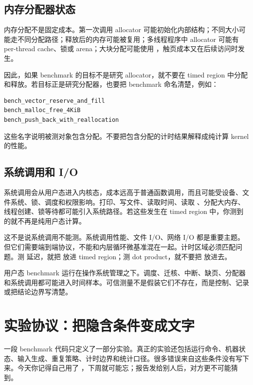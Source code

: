 \subsection{内存分配器状态}

内存分配不是固定成本。第一次调用 allocator 可能初始化内部结构；不同大小可能走不同分配路径；释放后的内存可能被复用；多线程程序中 allocator 可能有 per-thread cache、锁或 arena；大块分配可能使用 ，触页成本又在后续访问时发生。

因此，如果 benchmark 的目标不是研究 allocator，就不要在 timed region 中分配和释放。若目标正是研究分配器，也要把 benchmark 命名清楚，例如：

\begin{lstlisting}
bench_vector_reserve_and_fill
bench_malloc_free_4KiB
bench_push_back_with_reallocation
\end{lstlisting}

这些名字说明被测对象包含分配。不要把包含分配的计时结果解释成纯计算 kernel 的性能。

\subsection{系统调用和 I/O}

系统调用会从用户态进入内核态，成本远高于普通函数调用，而且可能受设备、文件系统、锁、调度和权限影响。打印、写文件、读取时间、读取 、分配大内存、线程创建、锁等待都可能引入系统路径。若这些发生在 timed region 中，你测到的就不再是纯用户态计算。

这不是说系统调用不能测。系统调用性能、文件 I/O、网络 I/O 都是重要主题。但它们需要端到端协议，不能和内层循环微基准混在一起。计时区域必须匹配问题。测  延迟，就把  放进 timed region；测 dot product，就不要把  放进去。

\begin{keyidea}
用户态 benchmark 运行在操作系统管理之下。调度、迁核、中断、缺页、分配器和系统调用都可能进入时间样本。可信测量不是假装它们不存在，而是控制、记录或把结论边界写清楚。
\end{keyidea}

\section{实验协议：把隐含条件变成文字}

一段 benchmark 代码只定义了一部分实验。真正的实验还包括运行命令、机器状态、输入生成、重复策略、计时边界和统计口径。很多错误来自这些条件没有写下来。今天你记得自己用了 ，下周就可能忘；报告发给别人后，对方更不可能猜到。

